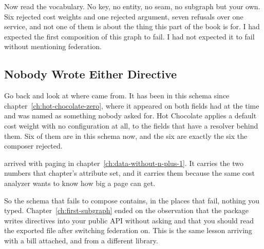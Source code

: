 %
Now read the vocabulary. No key, no entity, no seam, no subgraph but your own.
Six rejected cost weights and one rejected argument, seven refusals over one
service, and not one of them is about the thing this part of the book is for. I
had expected the first composition of this graph to fail. I had not expected it
to fail without mentioning federation.

\subsection{Nobody Wrote Either Directive}

%
Go back and look at where  came from. It has been in this schema
since chapter~\ref{ch:hot-chocolate-zero}, where it appeared on both fields
 had at the time and was named as something nobody asked for. Hot
Chocolate applies a default cost weight with no configuration at all, to the
fields that have a resolver behind them. Six of them are in this schema now,
and the six are exactly the six the composer rejected.

%
 arrived with paging in
chapter~\ref{ch:data-without-n-plus-1}. It carries the two numbers that
chapter's \code{[UsePaging]} attribute set, and it carries them because the
same cost analyzer wants to know how big a page can get.

%
So the schema that fails to compose contains, in the places that fail, nothing
you typed. Chapter~\ref{ch:first-subgraph} ended on the observation that the
package writes directives into your public API without asking and that you
should read the exported file after switching federation on. This is the same
lesson arriving with a bill attached, and from a different library.
%
